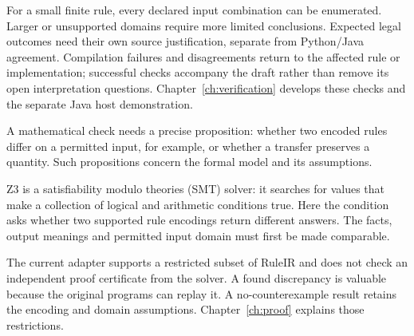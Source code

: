 \documentclass[12pt,a4paper,oneside,openany]{book}
\begin{document}
For a small finite rule, every declared input combination can be enumerated.
Larger or unsupported domains require more limited conclusions. Expected legal
outcomes need their own source justification, separate from Python/Java
agreement. Compilation failures and disagreements return to the affected rule
or implementation; successful checks accompany the draft rather than remove
its open interpretation questions. Chapter~\ref{ch:verification} develops
these checks and the separate Java host demonstration.

\clearpage
{}
A mathematical check needs a precise proposition: whether two encoded rules
differ on a permitted input, for example, or whether a transfer preserves a
quantity. Such propositions concern the formal model and its assumptions.

Z3 is a satisfiability modulo theories (SMT) solver: it searches for values that
make a collection of logical and arithmetic conditions true. Here the condition
asks whether two supported rule encodings return different answers. The facts,
output meanings and permitted input domain must first be made comparable.

\begin{MapDiagram}
\end{MapDiagram}

The current adapter supports a restricted subset of RuleIR and does not check
an independent proof certificate from the solver. A found discrepancy is
valuable because the original programs can replay it. A no-counterexample
result retains the encoding and domain assumptions. Chapter~\ref{ch:proof}
explains those restrictions.
\end{document}
